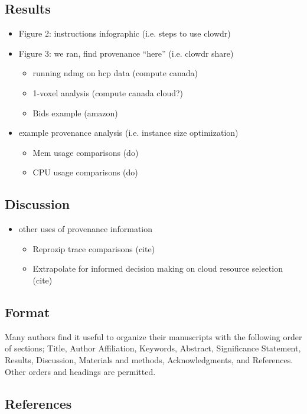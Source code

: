 \documentclass[9pt,twocolumn,twoside]{pnas-new}
\begin{document}
\subsection*{Results}
\begin{itemize}
\item Figure 2: instructions infographic (i.e. steps to use clowdr)
\item Figure 3: we ran, find provenance “here” (i.e. clowdr share)
\begin{itemize}
\item running ndmg on hcp data (compute canada)
\item 1-voxel analysis (compute canada cloud?)
\item Bids example (amazon)
\end{itemize}
\item example provenance analysis (i.e. instance size optimization)
\begin{itemize}
\item Mem usage comparisons (do)
\item CPU usage comparisons (do)
\end{itemize}
\end{itemize}

\subsection*{Discussion}
\begin{itemize}
\item other uses of provenance information
\begin{itemize}
\item Reprozip trace comparisons (cite)
\item Extrapolate for informed decision making on cloud resource selection (cite)
\end{itemize}
\end{itemize}


\subsection*{Format}

Many authors find it useful to organize their manuscripts with the following order of sections;  Title, Author Affiliation, Keywords, Abstract, Significance Statement, Results, Discussion, Materials and methods, Acknowledgments, and References. Other orders and headings are permitted.

\subsection*{References}
\end{document}
